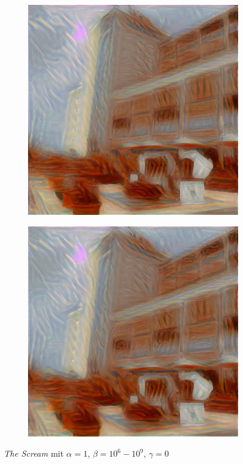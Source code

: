 \begin{figure}[H]
\begin{subfigure}[h]{0.24\textwidth}
    \end{subfigure}
    \begin{subfigure}[h]{0.24\textwidth}
        \centering
        \includegraphics[width=\textwidth]{resources/content/experiments/a__the_scream__768x768__style-weight_1e+08__tv-weight_0e+00.jpg}
    \end{subfigure}
    \begin{subfigure}[h]{0.24\textwidth}
        \centering
        \includegraphics[width=\textwidth]{resources/content/experiments/a__the_scream__768x768__style-weight_1e+09__tv-weight_0e+00.jpg}
    \end{subfigure}
    \caption{\textit{The Scream} mit $ \alpha = 1 $, $ \beta = 10^{6} - 10^{9} $, $ \gamma = 0 $}
\end{figure}

